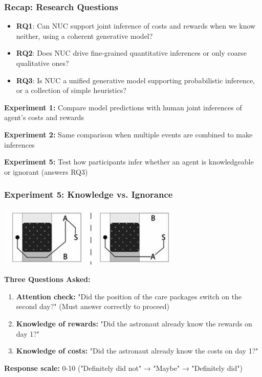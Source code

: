 \documentclass{beamer}
\begin{document}
\begin{frame}
\frametitle{Recap: Research Questions}
\begin{itemize}
    \item \textbf{RQ1}: Can NUC support joint inference of costs and rewards when we know neither, using a coherent generative model?
    \item \textbf{RQ2}: Does NUC drive fine-grained quantitative inferences or only coarse qualitative ones?
    \item \textbf{RQ3}: Is NUC a unified generative model supporting probabilistic inference, or a collection of simple heuristics?
\end{itemize}

\vspace{0.5cm}
\textbf{Experiment 1:} Compare model predictions with human joint inferences of agent's costs and rewards

\vspace{0.3cm}
\textbf{Experiment 2:} Same comparison when multiple events are combined to make inferences

\vspace{0.3cm}
\textbf{Experiment 5:} Test how participants infer whether an agent is knowledgeable or ignorant (answers RQ3)
\end{frame}

\begin{frame}
\frametitle{Experiment 5: Knowledge vs. Ignorance}
\begin{center}
\includegraphics[width=0.65\textwidth]{experiment_5.png}
\end{center}

\vspace{0.15cm}
\textbf{Three Questions Asked:}
\begin{enumerate}
    \item \textbf{Attention check:} "Did the position of the care packages switch on the second day?" (Must answer correctly to proceed)
    
    \vspace{0.2cm}
    \item \textbf{Knowledge of rewards:} "Did the astronaut already know the rewards on day 1?"
    
    \vspace{0.2cm}
    \item \textbf{Knowledge of costs:} "Did the astronaut already know the costs on day 1?"
\end{enumerate}

\vspace{0.3cm}
\textbf{Response scale:} 0-10 ("Definitely did not" → "Maybe" → "Definitely did")
\end{frame}
\end{document}
